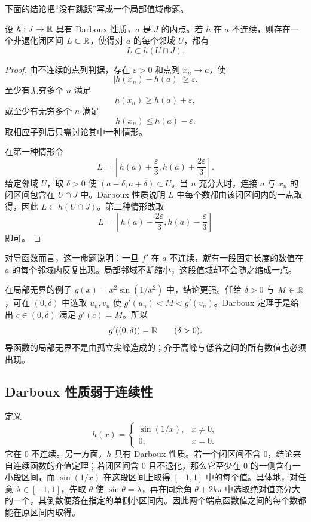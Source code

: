下面的结论把“没有跳跃”写成一个局部值域命题。

\begin{proposition}[间断点处的持久值区间]
\label{prop:persistent-value-interval}
设 \(h:J\to\mathbb{R}\) 具有 Darboux 性质，\(a\) 是 \(J\) 的内点。若 \(h\) 在 \(a\) 不连续，则存在一个非退化闭区间 \(L\subset\mathbb{R}\)，使得对 \(a\) 的每个邻域 \(U\)，都有
\[
 L\subset h(U\cap J).
\]
\end{proposition}

\begin{proof}
由不连续的点列判据，存在 \(\varepsilon>0\) 和点列 \(x_n\to a\)，使
\[
 |h(x_n)-h(a)|\ge\varepsilon.
\]
至少有无穷多个 \(n\) 满足
\[
 h(x_n)\ge h(a)+\varepsilon,
\]
或至少有无穷多个 \(n\) 满足
\[
 h(x_n)\le h(a)-\varepsilon.
\]
取相应子列后只需讨论其中一种情形。

在第一种情形令
\[
 L=\left[h(a)+\frac{\varepsilon}{3},
          h(a)+\frac{2\varepsilon}{3}\right].
\]
给定邻域 \(U\)，取 \(\delta>0\) 使 \((a-\delta,a+\delta)\subset U\)。当 \(n\) 充分大时，连接 \(a\) 与 \(x_n\) 的闭区间包含在 \(U\cap J\) 中。Darboux 性质说明 \(L\) 中每个数都由该闭区间内的一点取得，因此 \(L\subset h(U\cap J)\)。第二种情形改取
\[
 L=\left[h(a)-\frac{2\varepsilon}{3},
          h(a)-\frac{\varepsilon}{3}\right]
\]
即可。
\end{proof}

对导函数而言，这一命题说明：一旦 \(f'\) 在 \(a\) 不连续，就有一段固定长度的数值在 \(a\) 的每个邻域内反复出现。局部邻域不断缩小，这段值域却不会随之缩成一点。

在局部无界的例子 \(g(x)=x^2\sin(1/x^2)\) 中，结论更强。任给 \(\delta>0\) 与 \(M\in\mathbb{R}\)，可在 \((0,\delta)\) 中选取 \(u_n,v_n\) 使 \(g'(u_n)<M<g'(v_n)\)。Darboux 定理于是给出 \(c\in(0,\delta)\) 满足 \(g'(c)=M\)。所以
\[
 g'((0,\delta))=\mathbb{R}
 \qquad(\delta>0).
\]
导函数的局部无界不是由孤立尖峰造成的；介于高峰与低谷之间的所有数值也必须出现。

\subsection{Darboux 性质弱于连续性}

定义
\[
 h(x)=
 \begin{cases}
  \sin(1/x),&x\ne0,\\
  0,&x=0.
 \end{cases}
\]
它在 \(0\) 不连续。另一方面，\(h\) 具有 Darboux 性质。若一个闭区间不含 \(0\)，结论来自连续函数的介值定理；若闭区间含 \(0\) 且不退化，那么它至少在 \(0\) 的一侧含有一小段区间，而 \(\sin(1/x)\) 在这段区间上取得 \([-1,1]\) 中的每个值。具体地，对任意 \(\lambda\in[-1,1]\)，先取 \(\theta\) 使 \(\sin\theta=\lambda\)，再在同余角 \(\theta+2k\pi\) 中选取绝对值充分大的一个，其倒数便落在指定的单侧小区间内。因此两个端点函数值之间的每个数都能在原区间内取得。

